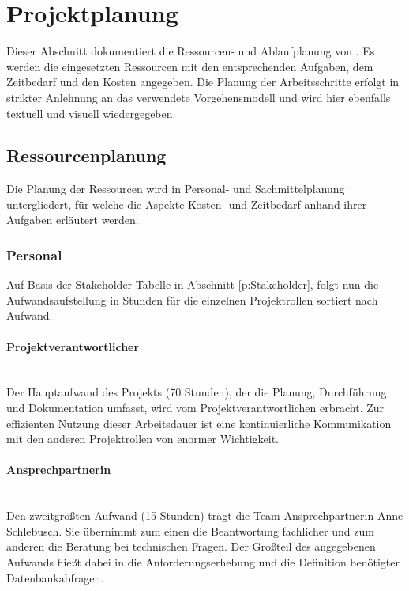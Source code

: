 \section{Projektplanung}\label{sec:Projektplanung}
Dieser Abschnitt dokumentiert die Ressourcen- und Ablaufplanung von \projektName. Es werden die eingesetzten Ressourcen mit den entsprechenden Aufgaben, dem Zeitbedarf und den Kosten angegeben. Die Planung der Arbeitsschritte erfolgt in strikter Anlehnung an das verwendete Vorgehensmodell und wird hier ebenfalls textuell und visuell wiedergegeben.

\subsection{Ressourcenplanung}\label{sec:Ressourcenplanung}
Die Planung der Ressourcen wird in Personal- und Sachmittelplanung untergliedert, für welche die Aspekte Kosten- und Zeitbedarf anhand ihrer Aufgaben erläutert werden.

\subsubsection{Personal}\label{sec:Personal}
Auf Basis der Stakeholder-Tabelle in Abschnitt \ref{p:Stakeholder}, folgt nun die Aufwandsaufstellung in Stunden für die einzelnen Projektrollen sortiert nach Aufwand.

\paragraph{Projektverantwortlicher}~\\\label{p:Projektverantwortlicher}
Der Hauptaufwand des Projekts (70 Stunden), der \ua die Planung, Durchführung und Dokumentation umfasst, wird vom Projektverantwortlichen \autorName\xspace erbracht. Zur effizienten Nutzung dieser Arbeitsdauer ist eine kontinuierliche Kommunikation mit den anderen Projektrollen von enormer Wichtigkeit.

\paragraph{Ansprechpartnerin}~\\\label{p:Ansprechpartnerin}
Den zweitgrößten Aufwand (15 Stunden) trägt die Team-Ansprechpartnerin Anne Schlebusch. Sie übernimmt zum einen die Beantwortung fachlicher und zum anderen die Beratung bei technischen Fragen. Der Großteil des angegebenen Aufwands fließt dabei in die Anforderungserhebung und die Definition benötigter Datenbankabfragen.

